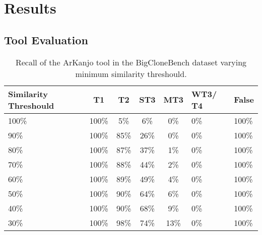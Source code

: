 \documentclass[conference]{IEEEtran}
\begin{document}
\section{Results}

\subsection{Tool Evaluation}

\begin{table}[!t]

\centering

\renewcommand{\arraystretch}{1.3}
\begin{tabular}{ | m{13mm} | c | c | c | c | m{6mm} | m{6mm} | }

\hline

\textbf{Similarity Threshould} & \textbf{T1} & \textbf{T2} & ST3 & MT3
& WT3/ T4 & \textbf{False} \\ \hline

100\% & 100\% & 5\% & 6\% & 0\% & 0\% & 100\% \\ \hline
90\% & 100\% & 85\% & 26\% & 0\% & 0\% & 100\% \\ \hline
80\% & 100\% & 87\% & 37\% & 1\% & 0\% & 100\% \\ \hline
70\% & 100\% & 88\% & 44\% & 2\% & 0\% & 100\% \\ \hline
60\% & 100\% & 89\% & 49\% & 4\% & 0\% & 100\% \\ \hline
50\% & 100\% & 90\% & 64\% & 6\% & 0\% & 100\% \\ \hline
40\% & 100\% & 90\% & 68\% & 9\% & 0\% & 100\% \\ \hline
30\% & 100\% & 98\% & 74\% & 13\% & 0\% & 100\% \\ \hline

\hline
\end{tabular}
\caption{Recall of the ArKanjo tool in the BigCloneBench dataset varying minimum similarity threshould.}
\label{tab:bigclone}
\end{table}
\end{document}

